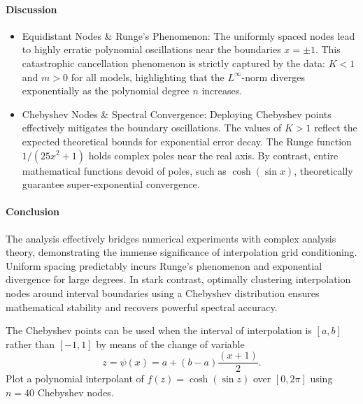 \begin{solution}
	\paragraph{Discussion}
	\begin{itemize}
		\item Equidistant Nodes \& Runge's Phenomenon: The uniformly spaced
		      nodes lead to highly erratic polynomial oscillations near the boundaries $x=\pm
			      1$. This catastrophic cancellation phenomenon is strictly captured by the data:
		      $K < 1$ and $m > 0$ for all models, highlighting that the $L^\infty$-norm
		      diverges exponentially as the polynomial degree $n$ increases.

		\item Chebyshev Nodes \& Spectral Convergence: Deploying Chebyshev
		      points effectively mitigates the boundary oscillations. The values of $K > 1$
		      reflect the expected theoretical bounds for exponential error decay. The Runge
		      function $1/(25x^2+1)$ holds complex poles near the real axis. By contrast,
		      entire mathematical functions devoid of poles, such as $\cosh(\sin x)$,
		      theoretically guarantee super-exponential convergence.
	\end{itemize}

	\paragraph{Conclusion}
	The analysis effectively bridges numerical experiments with complex analysis
	theory, demonstrating the immense significance of interpolation grid
	conditioning. Uniform spacing predictably incurs Runge's phenomenon and
	exponential divergence for large degrees. In stark contrast, optimally
	clustering interpolation nodes around interval boundaries using a Chebyshev
	distribution ensures mathematical stability and recovers powerful spectral
	accuracy.

\end{solution}

\begin{exercise}
	The Chebyshev points can be used when the interval of interpolation is
	$[a,b]$ rather than $[-1,1]$ by means of the change of variable
	\begin{equation*}
		z = \psi(x) = a + (b-a)\frac{(x+1)}{2}.
	\end{equation*}
	Plot a polynomial interpolant of $f(z) =\cosh(\sin z)$ over $[0,2\pi]$ using
	$n=40$ Chebyshev nodes.
\end{exercise}

